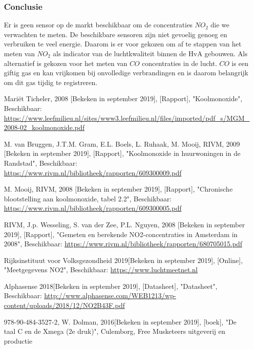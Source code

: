 \documentclass[a4paper, 11pt]{article} %
\begin{document}
	\subsubsection{Conclusie}
	Er is geen sensor op de markt beschikbaar om de concentraties $NO_2$ die we verwachten te meten. De beschikbare sensoren zijn niet gevoelig genoeg en verbruiken te veel energie. Daarom is er voor gekozen om af te stappen van het meten van $NO_2$ als indicator van de luchtkwaliteit binnen de HvA gebouwen. Als alternatief is gekozen voor het meten van $CO$ concentraties in de lucht. $CO$ is een giftig gas en kan vrijkomen bij onvolledige verbrandingen en is daarom belangrijk om dit gas tijdig te registreren.
	\newpage
	\begin{thebibliography}{9}
		Mariët Ticheler, 
		2008 [Bekeken in september 2019],
		[Rapport],
		"Koolmonoxide",
		Beschikbaar: \url{https://www.leefmilieu.nl/sites/www3.leefmilieu.nl/files/imported/pdf_s/MGM_2008-02_koolmonoxide.pdf}
		
		M. van Bruggen, J.T.M. Gram, E.L. Boels, L. Ruhaak, M. Mooij,
		RIVM,
		2009 [Bekeken in september 2019],
		[Rapport],
		"Koolmonoxide in huurwoningen in de Randstad",
		Beschikbaar: \url{https://www.rivm.nl/bibliotheek/rapporten/609300009.pdf}
		
		M. Mooij,
		RIVM,
		2008 [Bekeken in september 2019],
		[Rapport],
		"Chronische blootstelling aan koolmonoxide, tabel 2.2",
		Beschikbaar: \url{https://www.rivm.nl/bibliotheek/rapporten/609300005.pdf}
		
		RIVM, J.p. Wesseling, S. van der Zee, P.L. Nguyen,
		2008 [Bekeken in september 2019],
		[Rapport],
		"Gemeten en berekende NO2-concentraties in Amsterdam in 2008",
		Beschikbaar: \url{https://www.rivm.nl/bibliotheek/rapporten/680705015.pdf}
		
		Rijksinstituut voor Volksgezondheid
		2019[Bekeken in september 2019],
		[Online],
		"Meetgegevens NO2",
		Beschikbaar: \url{https://www.luchtmeetnet.nl}
		
		Alphasense
		2018[Bekeken in september 2019],
		[Datasheet],
		"Datasheet",
		Beschikbaar: \url{http://www.alphasense.com/WEB1213/wp-content/uploads/2018/12/NO2B43F.pdf}
		
		978-90-484-3527-2,
		W. Dolman,
		2016[Bekeken in september 2019],
		[boek],
		"De taal C en de Xmega (2e druk)",
		Culemborg,
		Free Musketeers uitgeverij en productie
		

\end{thebibliography}
\end{document}

